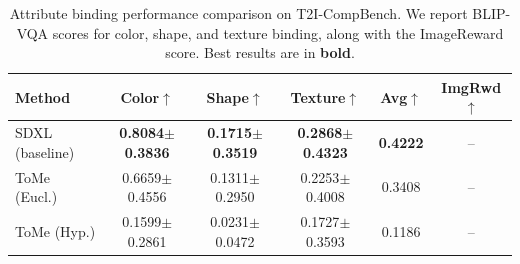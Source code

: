 \begin{table}[t]
\centering
\caption{Attribute binding performance comparison on T2I-CompBench. We report BLIP-VQA scores for color, shape, and texture binding, along with the ImageReward score. Best results are in \textbf{bold}.}
\label{tab:main_comparison}
\begin{tabular}{l|ccc|c|c}
\toprule
Method & Color$\uparrow$ & Shape$\uparrow$ & Texture$\uparrow$ & Avg$\uparrow$ & ImgRwd$\uparrow$ \\
\midrule
SDXL (baseline) & \textbf{0.8084$\pm$0.3836} & \textbf{0.1715$\pm$0.3519} & \textbf{0.2868$\pm$0.4323} & \textbf{0.4222} & -- \\
ToMe (Eucl.) & 0.6659$\pm$0.4556 & 0.1311$\pm$0.2950 & 0.2253$\pm$0.4008 & 0.3408 & -- \\
ToMe (Hyp.) & 0.1599$\pm$0.2861 & 0.0231$\pm$0.0472 & 0.1727$\pm$0.3593 & 0.1186 & -- \\
\bottomrule
\end{tabular}
\end{table}